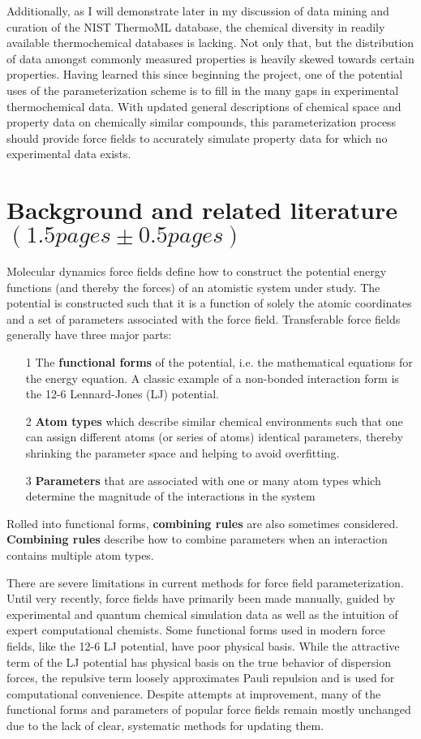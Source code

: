 \documentclass[rmp,nofootinbib,superscriptaddress,12pt,tightenlines,notitlepage]{revtex4-1}
\begin{document}
Additionally, as I will demonstrate later in my discussion of data mining and curation of the NIST ThermoML database,
the chemical diversity in readily available thermochemical databases is lacking. Not only that, but the distribution of data
amongst commonly measured properties is heavily skewed towards certain properties. Having learned this since beginning the
project, one of the potential uses of the parameterization scheme is to fill in the many gaps in experimental thermochemical 
data. With updated general descriptions of chemical space and property data on chemically similar compounds, this parameterization
process should provide force fields to accurately simulate property data for which no experimental data exists. 

\section{Background and related literature $\left(1.5 pages \pm 0.5 pages\right)$}
Molecular dynamics force fields define how to construct the potential energy functions (and thereby the forces) 
of an atomistic system under study. The potential is constructed such that it is a function of solely the atomic 
coordinates and a set of parameters associated with the force field. Transferable force fields generally have 
three major parts: 
  \begin{itemize}
   \item [1] The \textbf{functional forms} of the potential, i.e. the mathematical equations for the energy equation. A classic example of a non-bonded interaction form is the 12-6 Lennard-Jones (LJ) potential.   
   \item [2] \textbf{Atom types} which describe similar chemical environments such that one can assign different atoms (or series of atoms) identical parameters, thereby shrinking the parameter space and helping to avoid overfitting.
   \item [3] \textbf{Parameters} that are associated with one or many atom types which determine the magnitude of the interactions in the system 
  \end{itemize}
Rolled into functional forms, \textbf{combining rules} are also sometimes considered. \textbf{Combining rules} describe how to combine parameters 
when an interaction contains multiple atom types.

There are severe limitations in current methods for force field parameterization. Until very 
recently, force fields have primarily been made manually, guided by experimental and quantum chemical simulation 
data as well as the intuition of expert computational chemists.\cite{charmm1,charmm2,mm2,mmff,amber} Some functional 
forms used in modern force fields, like the 12-6 LJ potential, have poor physical basis. While the attractive term 
of the LJ potential has physical basis on the true behavior of dispersion forces, the repulsive term loosely 
approximates Pauli repulsion and is used for computational convenience. Despite attempts at improvement, many of 
the functional forms and parameters of popular force fields remain mostly unchanged due to the lack of clear, 
systematic methods for updating them.\cite{unchanged}
\end{document}
